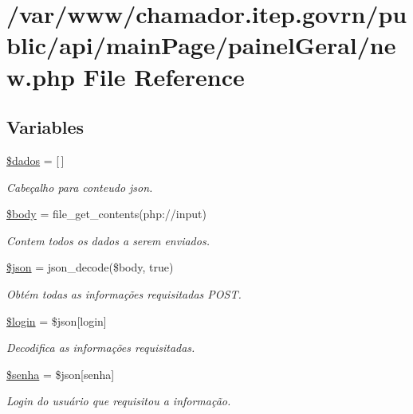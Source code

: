 \hypertarget{main_page_2painel_geral_2new_8php}{}\section{/var/www/chamador.itep.\+govrn/public/api/main\+Page/painel\+Geral/new.php File Reference}
\label{main_page_2painel_geral_2new_8php}
\subsection*{Variables}
\begin{DoxyCompactItemize}
\item 
\hyperlink{main_page_2painel_geral_2new_8php_a252370d95039a38fa11afab784725d58}{\$dados} = \mbox{[}$\,$\mbox{]}
\begin{DoxyCompactList}\small\item\em Cabeçalho para conteudo json. \end{DoxyCompactList}\item 
\hyperlink{main_page_2painel_geral_2new_8php_a26b9f9373f7bb79dfcf8a86dff086b45}{\$body} = file\+\_\+get\+\_\+contents(\textquotesingle{}php\+://input\textquotesingle{})
\begin{DoxyCompactList}\small\item\em Contem todos os dados a serem enviados. \end{DoxyCompactList}\item 
\hyperlink{main_page_2painel_geral_2new_8php_acedd13b51401130848ce18f4d5c52605}{\$json} = json\+\_\+decode(\$body, true)
\begin{DoxyCompactList}\small\item\em Obtém todas as informações requisitadas P\+O\+ST. \end{DoxyCompactList}\item 
\hyperlink{main_page_2painel_geral_2new_8php_afc31993e855f9631572adfedcfe6f34b}{\$login} = \$json\mbox{[}\textquotesingle{}login\textquotesingle{}\mbox{]}
\begin{DoxyCompactList}\small\item\em Decodifica as informações requisitadas. \end{DoxyCompactList}\item 
\hyperlink{main_page_2painel_geral_2new_8php_a3678c8769c9698fd30581c1016c5f475}{\$senha} = \$json\mbox{[}\textquotesingle{}senha\textquotesingle{}\mbox{]}
\begin{DoxyCompactList}\small\item\em Login do usuário que requisitou a informação. \end{DoxyCompactList}\item 

\end{DoxyCompactItemize}
